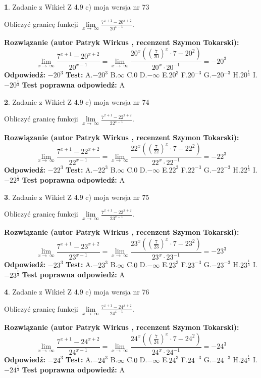\documentclass[12pt, a4paper]{article}
\theoremstyle{definition} %
\newtheorem{zad}{}
\newcommand{\zadStart}[1]{\begin{zad}#1\newline}
\newcommand{\zadStop}{\end{zad}}
\newcommand{\rozwStart}[2]{\noindent \textbf{Rozwiązanie (autor #1 , recenzent #2): }\newline}
\newcommand{\rozwStop}{\newline}
\newcommand{\odpStart}{\noindent \textbf{Odpowiedź:}\newline}
\newcommand{\odpStop}{\newline}
\newcommand{\testStart}{\noindent \textbf{Test:}\newline}
\newcommand{\testStop}{\newline}
\newcommand{\kluczStart}{\noindent \textbf{Test poprawna odpowiedź:}\newline}
\newcommand{\kluczStop}{\newline}
\begin{document}
\zadStart{Zadanie z Wikieł Z 4.9 c) moja wersja nr 73}


Obliczyć granicę funkcji  $\lim\limits_{x\to\ \infty}\frac{7^{x+1}-20^{x+2}}{20^{x-1}}$.
\zadStop
\rozwStart{Patryk Wirkus}{Szymon Tokarski}
$$\lim\limits_{x\to\ \infty}\frac{7^{x+1}-20^{x+2}}{20^{x-1}}=\lim\limits_{x\to\ \infty}\frac{20^{x}((\frac{7}{20})^{x}\cdot 7 -20^{2})}{20^{x}\cdot 20^{-1}} = -20^{3}$$
\rozwStop
\odpStart
$-20^{3}$
\odpStop
\testStart
A.$-20^{3}$ B.$\infty$ C.$0$ D.$-\infty$ E.$20^{3}$
F.$20^{-3}$ G.$-20^{-3}$
H.$20^{\frac{1}{3}}$
I.$-20^{\frac{1}{3}}$
\testStop
\kluczStart
A
\kluczStop



\zadStart{Zadanie z Wikieł Z 4.9 c) moja wersja nr 74}


Obliczyć granicę funkcji  $\lim\limits_{x\to\ \infty}\frac{7^{x+1}-22^{x+2}}{22^{x-1}}$.
\zadStop
\rozwStart{Patryk Wirkus}{Szymon Tokarski}
$$\lim\limits_{x\to\ \infty}\frac{7^{x+1}-22^{x+2}}{22^{x-1}}=\lim\limits_{x\to\ \infty}\frac{22^{x}((\frac{7}{22})^{x}\cdot 7 -22^{2})}{22^{x}\cdot 22^{-1}} = -22^{3}$$
\rozwStop
\odpStart
$-22^{3}$
\odpStop
\testStart
A.$-22^{3}$ B.$\infty$ C.$0$ D.$-\infty$ E.$22^{3}$
F.$22^{-3}$ G.$-22^{-3}$
H.$22^{\frac{1}{3}}$
I.$-22^{\frac{1}{3}}$
\testStop
\kluczStart
A
\kluczStop



\zadStart{Zadanie z Wikieł Z 4.9 c) moja wersja nr 75}


Obliczyć granicę funkcji  $\lim\limits_{x\to\ \infty}\frac{7^{x+1}-23^{x+2}}{23^{x-1}}$.
\zadStop
\rozwStart{Patryk Wirkus}{Szymon Tokarski}
$$\lim\limits_{x\to\ \infty}\frac{7^{x+1}-23^{x+2}}{23^{x-1}}=\lim\limits_{x\to\ \infty}\frac{23^{x}((\frac{7}{23})^{x}\cdot 7 -23^{2})}{23^{x}\cdot 23^{-1}} = -23^{3}$$
\rozwStop
\odpStart
$-23^{3}$
\odpStop
\testStart
A.$-23^{3}$ B.$\infty$ C.$0$ D.$-\infty$ E.$23^{3}$
F.$23^{-3}$ G.$-23^{-3}$
H.$23^{\frac{1}{3}}$
I.$-23^{\frac{1}{3}}$
\testStop
\kluczStart
A
\kluczStop



\zadStart{Zadanie z Wikieł Z 4.9 c) moja wersja nr 76}


Obliczyć granicę funkcji  $\lim\limits_{x\to\ \infty}\frac{7^{x+1}-24^{x+2}}{24^{x-1}}$.
\zadStop
\rozwStart{Patryk Wirkus}{Szymon Tokarski}
$$\lim\limits_{x\to\ \infty}\frac{7^{x+1}-24^{x+2}}{24^{x-1}}=\lim\limits_{x\to\ \infty}\frac{24^{x}((\frac{7}{24})^{x}\cdot 7 -24^{2})}{24^{x}\cdot 24^{-1}} = -24^{3}$$
\rozwStop
\odpStart
$-24^{3}$
\odpStop
\testStart
A.$-24^{3}$ B.$\infty$ C.$0$ D.$-\infty$ E.$24^{3}$
F.$24^{-3}$ G.$-24^{-3}$
H.$24^{\frac{1}{3}}$
I.$-24^{\frac{1}{3}}$
\testStop
\kluczStart
A
\kluczStop
\end{document}
